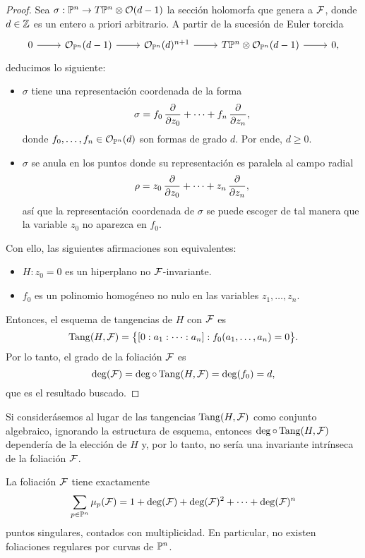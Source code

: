 \begin{proof}
Sea $\sigma : \P^n \to T\P^n \otimes \O(d-1)$ la sección holomorfa que genera a $\F$, donde $d \in \Z$ es un entero a priori arbitrario. A partir de la sucesión de Euler torcida
$$
\begin{tikzcd}
    0 \arrow[r]
        & \O_{\P^n}(d-1) \arrow[r]
        & \O_{\P^n}(d)^{n+1} \arrow[r]
        & T\P^n \otimes \O_{\P^n}(d-1) \arrow[r]
        & 0,
\end{tikzcd}
$$
deducimos lo siguiente:
\begin{itemize}
    \itemsep 0em
    \item $\sigma$ tiene una representación coordenada de la forma
    $$\sigma = f_0 \, \p {z_0} + \dots + f_n \, \p {z_n},$$
    donde $f_0, \dots, f_n \in \O_{\P^n}(d)$ son formas de grado $d$. Por ende, $d \ge 0$.
    
    \item $\sigma$ se anula en los puntos donde su representación es paralela al campo radial
    $$\rho = z_0 \, \p {z_0} + \dots + z_n \, \p {z_n},$$
    así que la representación coordenada de $\sigma$ se puede escoger de tal manera que la variable $z_0$ no aparezca en $f_0$.
\end{itemize}
Con ello, las siguientes afirmaciones son equivalentes:
\begin{itemize}
    \itemsep 0em
    \item $H : z_0 = 0$ es un hiperplano no $\F$-invariante.
    \item $f_0$ es un polinomio homogéneo no nulo en las variables $z_1, \dots, z_n$.
\end{itemize}
Entonces, el esquema de tangencias de $H$ con $\F$ es
$$\Tang(H, \F) = \big \{ [0 : a_1 : \dots : a_n] : f_0(a_1, \dots, a_n) = 0 \big \}.$$
Por lo tanto, el grado de la foliación $\F$ es
$$\deg(\F) = \deg \circ \Tang(H, \F) = \deg(f_0) = d,$$
que es el resultado buscado.
\end{proof}

\begin{remark}
Si considerásemos al lugar de las tangencias $\Tang(H, \F)$ como conjunto algebraico, ignorando la estructura de esquema, entonces $\deg \circ \Tang(H, \F)$ dependería de la elección de $H$ y, por lo tanto, no sería una invariante intrínseca de la foliación $\F$.
\end{remark}

\begin{theorem}[Darboux]
La foliación $\F$ tiene exactamente
$$\sum_{p \in \P^n} \mu_p(\F) = 1 + \deg(\F) + \deg(\F)^2 + \dots + \deg(\F)^n$$
puntos singulares, contados con multiplicidad. En particular, no existen foliaciones regulares por curvas de $\P^n$.
\end{theorem}

